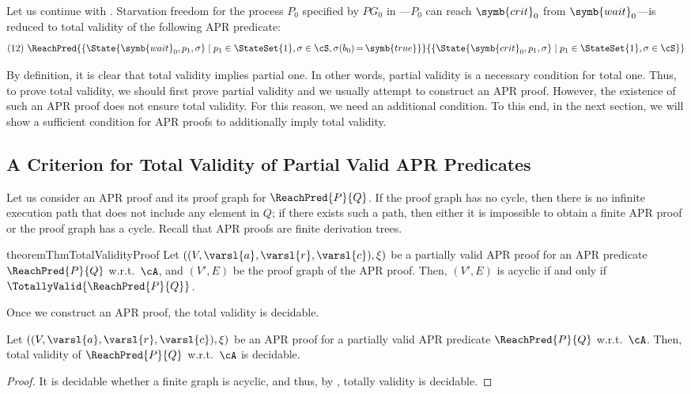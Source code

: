 \begin{example}
	\label{ex:APR-predicate-for-PG0-starvation-freedom}
	Let us continue with .
	Starvation freedom for the process $P_0$ specified by $\mathit{PG}_0$ in ---$P_0$ can reach $\symb{crit}_0$ from $\symb{wait}_0$---is reduced to total validity of the following APR predicate:
	\[
		(12)~
		\ReachPred{\{ \State{\symb{wait}_0,p_1,\sigma} \mid p_1 \in \StateSet{1}, \sigma \in \cS, \sigma(b_0) \,{=}\, \symb{true} \}}{\{ \State{\symb{crit}_0,p_1,\sigma} \mid p_1 \in \StateSet{1}, \sigma \in \cS \}}
	\]
\end{example}

By definition, it is clear that total validity implies partial one.
In other words, partial validity is a necessary condition for total one.
Thus, to prove total validity, we should first prove partial validity and we usually attempt to construct an APR proof.
However, the existence of such an APR proof does not ensure total validity.
For this reason, we need an additional condition.
To this end, in the next section, we will show a sufficient condition for APR proofs to additionally imply total validity.

\subsection{A Criterion for Total Validity of Partial Valid APR Predicates}
\label{subsec:proof-method-for-total-validity}

Let us consider an APR proof and its proof graph for $\ReachPred{P}{Q}$.
If the proof graph has no cycle, then there is no infinite execution path that does not include any element in $Q$;
if there exists such a path, then either it is impossible to obtain a finite APR proof or the proof graph has a cycle.
Recall that APR proofs are finite derivation trees.


\begin{restatable}{theorem}{ThmTotalValidityProof}
	\label{thm:total-validity-proof}
	Let $((V,\varsl{a},\varsl{r},\varsl{c}),\xi)$ be a partially valid APR proof for an APR predicate $\ReachPred{P}{Q}$ w.r.t.\ $\cA$,
	and $(V',E)$ be the proof graph of the APR proof. Then, $(V',E)$ is acyclic
	if and only if
	$\TotallyValid{\ReachPred{P}{Q}}$.
\end{restatable}

Once we construct an APR proof, the total validity is decidable.
\begin{corollary}\label{cor:decidability-of-total-validity-proof}
	Let $((V,\varsl{a},\varsl{r},\varsl{c}),\xi)$ be an APR proof for a partially valid APR predicate $\ReachPred{P}{Q}$ w.r.t.\ $\cA$.
	Then, total validity of $\ReachPred{P}{Q}$ w.r.t.\ $\cA$ is decidable.
\end{corollary}
\begin{proof}
	It is decidable whether a finite graph is acyclic, and thus,
	by , totally validity is decidable.
\end{proof}

